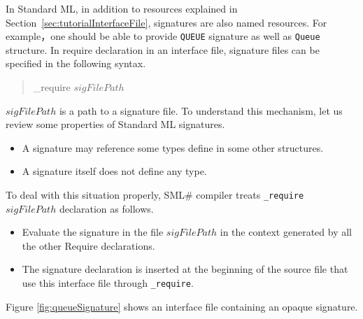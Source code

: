 \documentclass{jbook}
\newcommand{\smlsharp}{SML\#}
\newenvironment{program}{\begin{quote}\begin{tt}}%
                        {\end{tt}\end{quote}}
\begin{document}
\else%
	In Standard ML,  in addition to resources explained in
Section~\ref{sec:tutorialInterfaceFile}, signatures are also named
resources.
	For example，one should be able to provide {\tt QUEUE} signature
as well as {\tt Queue} structure.
	In require declaration in an interface file, signature files can
be specified in the following syntax. 
\begin{program}
\_require $sigFilePath$
\end{program}
	$sigFilePath$ is a path to a signature file.
	To understand this mechanism, let us review some properties of
Standard ML signatures.
\begin{itemize}
\item A  signature may reference some types define in some other
structures.
\item A signature itself does not define any type.
\end{itemize}
	To deal with this situation properly, \smlsharp{} compiler 
treats {\tt \_require $sigFilePath$} declaration as follows.
\begin{itemize}
\item 
	Evaluate the signature in the file $sigFilePath$
in the context generated by all the other Require declarations.
\item 
	The signature declaration is inserted at the beginning of the
source file that use this interface file through {\tt \_require}.
\end{itemize}
	Figure \ref{fig:queueSignature} shows an interface file
containing  an opaque signature.
\end{document}
